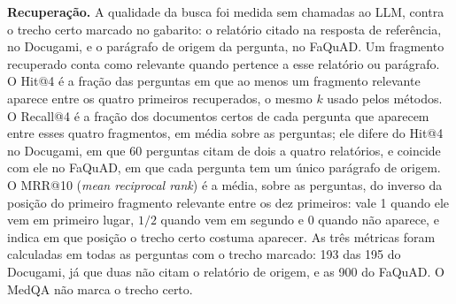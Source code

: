 \textbf{Recuperação.} A qualidade da busca foi medida sem chamadas ao LLM, contra o trecho certo marcado no gabarito: o relatório citado na resposta de referência, no Docugami, e o parágrafo de origem da pergunta, no FaQuAD. Um fragmento recuperado conta como relevante quando pertence a esse relatório ou parágrafo. O Hit@4 é a fração das perguntas em que ao menos um fragmento relevante aparece entre os quatro primeiros recuperados, o mesmo $k$ usado pelos métodos. O Recall@4 é a fração dos documentos certos de cada pergunta que aparecem entre esses quatro fragmentos, em média sobre as perguntas; ele difere do Hit@4 no Docugami, em que 60 perguntas citam de dois a quatro relatórios, e coincide com ele no FaQuAD, em que cada pergunta tem um único parágrafo de origem. O MRR@10 (\emph{mean reciprocal rank}) é a média, sobre as perguntas, do inverso da posição do primeiro fragmento relevante entre os dez primeiros: vale 1 quando ele vem em primeiro lugar, $1/2$ quando vem em segundo e 0 quando não aparece, e indica em que posição o trecho certo costuma aparecer. As três métricas foram calculadas em todas as perguntas com o trecho marcado: 193 das 195 do Docugami, já que duas não citam o relatório de origem, e as 900 do FaQuAD. O MedQA não marca o trecho certo.

